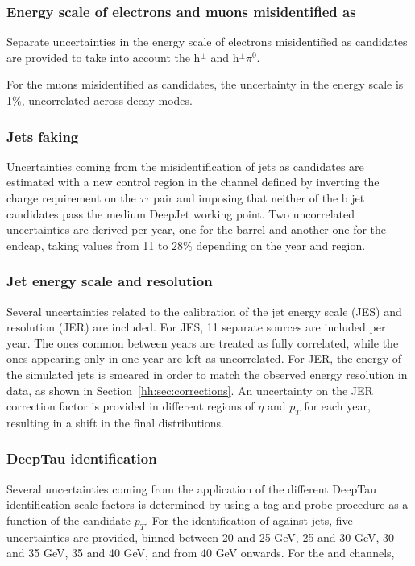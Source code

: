\documentclass[../main.tex]{subfiles}
\begin{document}
\subsubsection*{Energy scale of electrons and muons misidentified as \tauh{}}

Separate uncertainties in the energy scale of electrons misidentified as \tauh{} candidates are provided to take into account the h${}^\pm$ and h${}^\pm\pi^0$.

For the muons misidentified as \tauh{} candidates, the uncertainty in the energy scale is 1\%, uncorrelated across decay modes.

\subsubsection*{Jets faking \tauh}

Uncertainties coming from the misidentification of jets as \tauh{} candidates are estimated with a new control region in the \taumu\tauh{} channel defined by inverting the charge requirement on the $\tau\tau$ pair and imposing that neither of the b jet candidates pass the medium DeepJet working point. Two uncorrelated uncertainties are derived per year, one for the barrel and another one for the endcap, taking values from 11 to 28\% depending on the year and region.

\subsubsection*{Jet energy scale and resolution}

Several uncertainties related to the calibration of the jet energy scale (JES) and resolution (JER) are included. For JES, 11 separate sources are included per year. The ones common between years are treated as fully correlated, while the ones appearing only in one year are left as uncorrelated. For JER, the energy of the simulated jets is smeared in order to match the observed energy resolution in data, as shown in Section~\ref{hh:sec:corrections}. An uncertainty on the JER correction factor is provided in different regions of $\eta$ and $p_T$ for each year, resulting in a shift in the final distributions.


\subsubsection*{DeepTau identification}

Several uncertainties coming from the application of the different DeepTau identification scale factors is determined by using a tag-and-probe procedure as a function of the \tauh{} candidate $p_T$. For the identification of \tauh{} against jets, five uncertainties are provided, binned between 20 and 25 GeV, 25 and 30 GeV, 30 and 35 GeV, 35 and 40 GeV, and from 40 GeV onwards. For the \taue\tauh and \taumu\tauh channels, 
\end{document}
